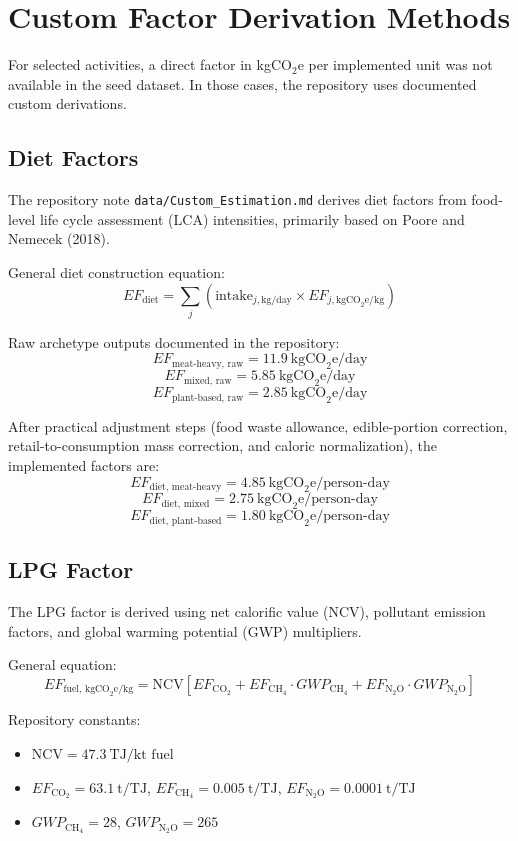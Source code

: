 \documentclass[11pt,a4paper]{article}
\begin{document}
\section{Custom Factor Derivation Methods}
For selected activities, a direct factor in kgCO\(_2\)e per implemented unit was not available in the seed dataset. In those cases, the repository uses documented custom derivations.

\subsection{Diet Factors}
The repository note \texttt{data/Custom\_Estimation.md} derives diet factors from food-level life cycle assessment (LCA) intensities, primarily based on Poore and Nemecek (2018).

General diet construction equation:
$$
EF_{\text{diet}} = \sum_j
\left(
\text{intake}_{j,\text{kg/day}} \times EF_{j,\text{kgCO}_2\text{e/kg}}
\right)
$$

Raw archetype outputs documented in the repository:
$$
EF_{\text{meat-heavy, raw}} = 11.9\ \text{kgCO}_2\text{e/day}
$$
$$
EF_{\text{mixed, raw}} = 5.85\ \text{kgCO}_2\text{e/day}
$$
$$
EF_{\text{plant-based, raw}} = 2.85\ \text{kgCO}_2\text{e/day}
$$

After practical adjustment steps (food waste allowance, edible-portion correction, retail-to-consumption mass correction, and caloric normalization), the implemented factors are:
$$
EF_{\text{diet, meat-heavy}} = 4.85\ \text{kgCO}_2\text{e/person-day}
$$
$$
EF_{\text{diet, mixed}} = 2.75\ \text{kgCO}_2\text{e/person-day}
$$
$$
EF_{\text{diet, plant-based}} = 1.80\ \text{kgCO}_2\text{e/person-day}
$$

\subsection{LPG Factor}
The LPG factor is derived using net calorific value (NCV), pollutant emission factors, and global warming potential (GWP) multipliers.

General equation:
$$
EF_{\text{fuel, kgCO}_2\text{e/kg}} =
\text{NCV}
\left[
EF_{\text{CO}_2}
+ EF_{\text{CH}_4} \cdot GWP_{\text{CH}_4}
+ EF_{\text{N}_2\text{O}} \cdot GWP_{\text{N}_2\text{O}}
\right]
$$

Repository constants:
\begin{itemize}
  \item \(\text{NCV} = 47.3\ \text{TJ/kt fuel}\)
  \item \(EF_{\text{CO}_2} = 63.1\ \text{t/TJ}\), \(EF_{\text{CH}_4} = 0.005\ \text{t/TJ}\), \(EF_{\text{N}_2\text{O}} = 0.0001\ \text{t/TJ}\)
  \item \(GWP_{\text{CH}_4} = 28\), \(GWP_{\text{N}_2\text{O}} = 265\)
\end{itemize}
\end{document}
